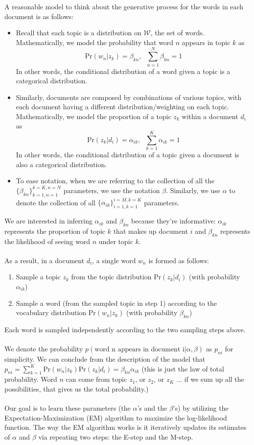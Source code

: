 \documentclass{exam}
\begin{document}
A reasonable model to think about the generative process for the words in each document is as follows: 
\begin{itemize}
    \item Recall that each topic is a distribution on $\mathcal{W}$, the set of words. Mathematically, we model the probability that word $n$ appears in topic $k$ as $$\mathrm{Pr}(w_n|z_k) = \beta_{kn}, \;\;\sum_{n=1}^{N}\beta_{kn}=1$$ 
    In other words, the conditional distribution of a word given a topic is a categorical distribution. 
    \item Similarly, documents are composed by combinations of various topics, with each document having a different distribution/weighting on each topic. Mathematically, we model the proportion of a topic $z_k$ within a document $d_i$ as $$\mathrm{Pr}(z_k|d_i) = \alpha_{ik}, \;\;\sum_{k=1}^{K}\alpha_{ik}=1$$ 
    In other words, the conditional distribution of a topic given a document is also a categorical distribution.

    \item To ease notation, when we are referring to the collection of all the $\{\beta_{kn}\}_{k = 1, n = 1}^{k = K, n = N}$ parameters, we use the notation $\beta$. Similarly, we use $\alpha$ to denote the collection of all $\{\alpha_{ik}\}_{i = 1, k = 1}^{i = M, k = K}$ parameters.
    
\end{itemize}
We are interested in inferring $\alpha_{ik}$ and $\beta_{kn}$ because they're informative: $\alpha_{ik}$ represents the proportion of topic $k$ that makes up document $i$ and $\beta_{kn}$ represents the likelihood of seeing word $n$ under topic $k$. 
\\\\As a result, in a document $d_i$, a single word $w_n$ is formed as follows: 
\begin{enumerate}
    \item Sample a topic $z_k$ from the topic distribution $\mathrm{Pr}(z_k|d_i)$ (with probability $\alpha_{ik}$)
    \item Sample a word (from the sampled topic in step 1) according to the vocabulary distribution $\mathrm{Pr}(w_n|z_k)$ (with probability $\beta_{kn}$) 
\end{enumerate}
Each word is sampled independently according to the two sampling steps above.
\\\\We denote the probability $p(\text{word n appears in document i}|\alpha, \beta)$ as $p_{ni}$ for simplicity. We can conclude from the description of the model that $p_{ni} = \sum_{k = 1}^K \mathrm{Pr}(w_n|z_k)\mathrm{Pr}(z_k|d_i) =  \beta_{kn}\alpha_{ik}$ (this is just the law of total probability. Word $n$ can come from topic $z_1$, or $z_2$, or $z_K$ ... if we sum up all the possibilities, that gives us the total probability.)
\\\\
Our goal is to learn these parameters (the $\alpha$'s and the $\beta$'s) by utilizing the Expectation-Maximization (EM) algorithm to maximize the log-likelihood function. The way the EM algorithm works is it iteratively updates its estimates of $\alpha$ and $\beta$ via repeating two steps: the E-step and the M-step. 
\end{document}
